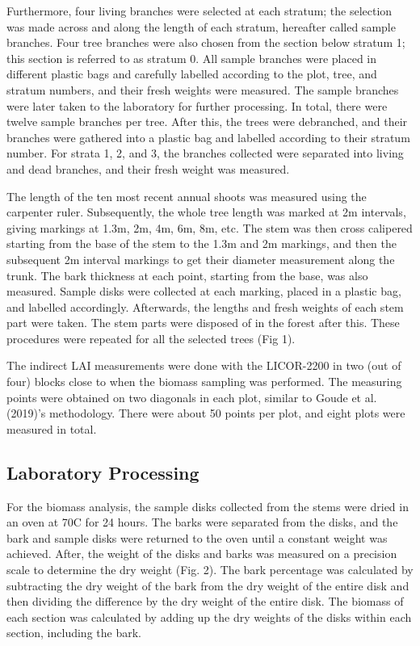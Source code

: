 \documentclass[11pt, a4paper]{report}
\begin{document}
Furthermore, four living branches were selected at each stratum; the selection was made across and along the length of each stratum, hereafter called sample branches. Four tree branches were also chosen from the section below stratum 1; this section is referred to as stratum 0. All sample branches were placed in different plastic bags and carefully labelled according to the plot, tree, and stratum numbers, and their fresh weights were measured. The sample branches were later taken to the laboratory for further processing. In total, there were twelve sample branches per tree. After this, the trees were debranched, and their branches were gathered into a plastic bag and labelled according to their stratum number. For strata 1, 2, and 3, the branches collected were separated into living and dead branches, and their fresh weight was measured.

The length of the ten most recent annual shoots was measured using the carpenter ruler. Subsequently, the whole tree length was marked at 2m intervals, giving markings at 1.3m, 2m, 4m, 6m, 8m, etc. The stem was then cross calipered starting from the base of the stem to the 1.3m and 2m markings, and then the subsequent 2m interval markings to get their diameter measurement along the trunk. The bark thickness at each point, starting from the base, was also measured. Sample disks were collected at each marking, placed in a plastic bag, and labelled accordingly. Afterwards, the lengths and fresh weights of each stem part were taken. The stem parts were disposed of in the forest after this. These procedures were repeated for all the selected trees (Fig 1).

The indirect LAI measurements were done with the LICOR-2200 in two (out of four) blocks close to when the biomass sampling was performed. The measuring points were obtained on two diagonals in each plot, similar to Goude et al. (2019)'s methodology. There were about 50 points per plot, and eight plots were measured in total.
\subsection{Laboratory Processing}
For the biomass analysis, the sample disks collected from the stems were dried in an oven at 70\degree C for 24 hours. The barks were separated from the disks, and the bark and sample disks were returned to the oven until a constant weight was achieved. After, the weight of the disks and barks was measured on a precision scale to determine the dry weight (Fig. 2). The bark percentage was calculated by subtracting the dry weight of the bark from the dry weight of the entire disk and then dividing the difference by the dry weight of the entire disk. The biomass of each section was calculated by adding up the dry weights of the disks within each section, including the bark.
\end{document}
